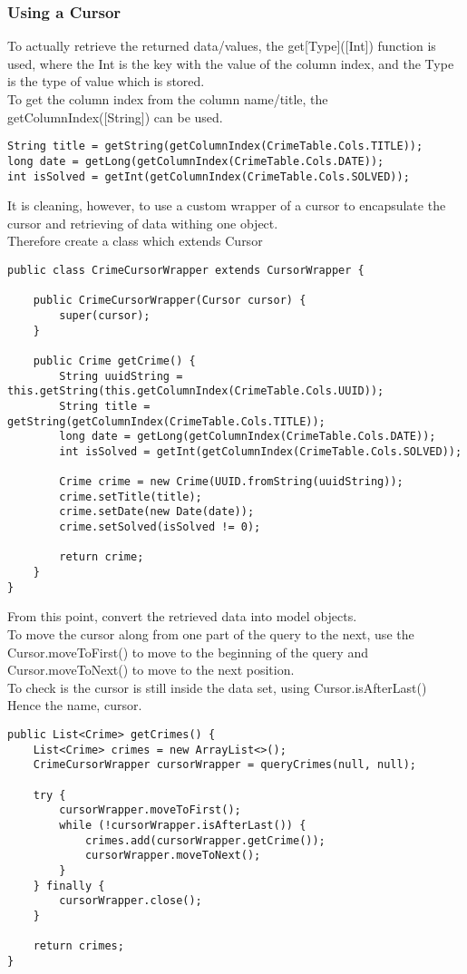 \documentclass[]{article}
\begin{document}
 \subsubsection{Using a Cursor}
 To actually retrieve the returned data/values, the get[Type]([Int]) function is used, where the Int is the key with the value of the column index, and the Type is the type of value which is stored.
 \\
 To get the column index from the column name/title, the getColumnIndex([String]) can be used.
 \begin{lstlisting}
String title = getString(getColumnIndex(CrimeTable.Cols.TITLE));
long date = getLong(getColumnIndex(CrimeTable.Cols.DATE));
int isSolved = getInt(getColumnIndex(CrimeTable.Cols.SOLVED));
 \end{lstlisting} 
 It is cleaning, however, to use a custom wrapper of a cursor to encapsulate the cursor and retrieving of data withing one object.
 \\
 Therefore create a class which extends Cursor
 \begin{lstlisting}
public class CrimeCursorWrapper extends CursorWrapper {

	public CrimeCursorWrapper(Cursor cursor) {
		super(cursor);
	}

	public Crime getCrime() {
		String uuidString = this.getString(this.getColumnIndex(CrimeTable.Cols.UUID));
		String title = getString(getColumnIndex(CrimeTable.Cols.TITLE));
		long date = getLong(getColumnIndex(CrimeTable.Cols.DATE));
		int isSolved = getInt(getColumnIndex(CrimeTable.Cols.SOLVED));

		Crime crime = new Crime(UUID.fromString(uuidString));
		crime.setTitle(title);
		crime.setDate(new Date(date));
		crime.setSolved(isSolved != 0);

		return crime;
	}
}
 \end{lstlisting}
From this point, convert the retrieved data into model objects.
\\
To move the cursor along from one part of the query to the next, use the Cursor.moveToFirst() to move to the beginning of the query and Cursor.moveToNext() to move to the next position.
\\
To check is the cursor is still inside the data set, using Cursor.isAfterLast()
\\
Hence the name, cursor.
\begin{lstlisting}
public List<Crime> getCrimes() {
	List<Crime> crimes = new ArrayList<>();
	CrimeCursorWrapper cursorWrapper = queryCrimes(null, null);

	try {
		cursorWrapper.moveToFirst();
		while (!cursorWrapper.isAfterLast()) {
			crimes.add(cursorWrapper.getCrime());
			cursorWrapper.moveToNext();
		}
	} finally {
		cursorWrapper.close();
	}
	
	return crimes;
}
\end{lstlisting}
\end{document}
